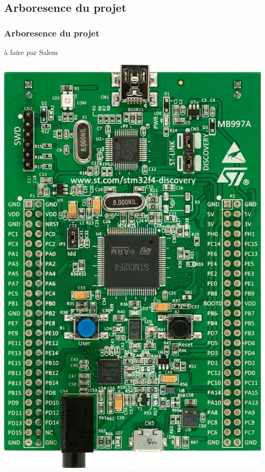\documentclass{beamer}
\begin{document}
\subsection{Arboresence du projet}
\begin{frame}
\frametitle{Arboresence du projet}
à faire par Salem
\begin{center}
 \includegraphics[scale=0.1]{../images/stm32f4_discovery.jpg}
\end{center}
\end{frame}
\end{document}
